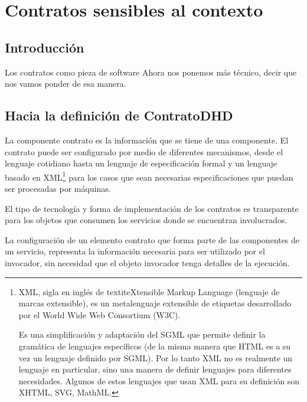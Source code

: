 \chapter{Contratos sensibles al contexto}\label{cap:contratos} \label{cap:5}


\section {Introducción}

Los contratos como pieza de software 
Ahora nos ponemos más técnico, decir que nos vamos ponder de esa manera.


\section{Hacia la definición de ContratoDHD}


La componente contrato es la información que se tiene de una componente. El contrato puede ser configurado por medio de diferentes mecanismos, desde el lenguaje cotidiano hasta un lenguaje de especificación formal y un lenguaje basado en XML\footnote {XML, sigla en inglés de textit{eXtensible Markup Language} (lenguaje de marcas extensible), es un metalenguaje extensible de etiquetas desarrollado por el World Wide Web Consortium (W3C). 


    
Es una simplificación y adaptación del SGML que permite definir la gramática de lenguajes específicos (de la misma manera que HTML es a su vez un lenguaje definido por SGML). Por lo tanto XML no es realmente un lenguaje en particular, sino una manera de definir lenguajes para diferentes necesidades. Algunos de estos lenguajes que usan XML para su definición son XHTML, SVG, MathML.} para los casos que sean necesarias especificaciones que puedan ser procesadas por máquinas.



El tipo de tecnología y forma de implementación de los contratos es transparente para los objetos que consumen los servicios donde se encuentran involucrados.

La configuración de un elemento contrato que forma parte de las componentes de un servicio, representa la información necesaria  para ser utilizado por el invocador, sin necesidad que el objeto invocador tenga detalles de la ejecución.


